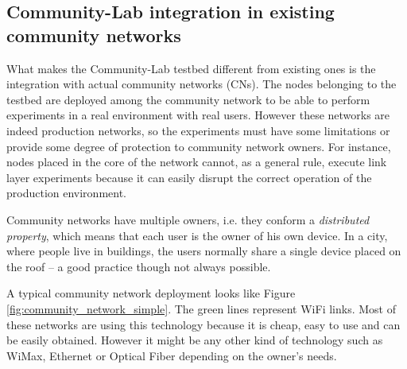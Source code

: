 \documentclass[conference]{IEEEtran}
\begin{document}





\subsection{Community-Lab integration in existing community networks}

What makes the Community-Lab testbed different from existing ones is the integration
with actual community networks (CNs). The nodes belonging to the testbed are deployed among the 
community network to be able to perform experiments in a real environment with real users. However 
these networks are indeed production networks, so the experiments must have some limitations or provide some
degree of protection to community network owners. For instance, nodes placed in the core of the network
cannot, as a general rule, execute link layer experiments because it can easily disrupt the correct
operation of the production environment.





Community networks have multiple owners, i.e. they conform a \textit{distributed property}, 
which means that each user is the owner of his own device. In a city, where people live in 
buildings, the users normally share a single device placed on the roof -- a good practice though
not always possible.

A typical community network deployment looks like Figure \ref{fig:community_network_simple}.
The green lines represent WiFi links. Most of these networks are using this technology because 
it is cheap, easy to use and can be easily obtained. However it might be any other kind of technology 
such as WiMax, Ethernet or Optical Fiber depending on the owner's needs.

\end{document}
